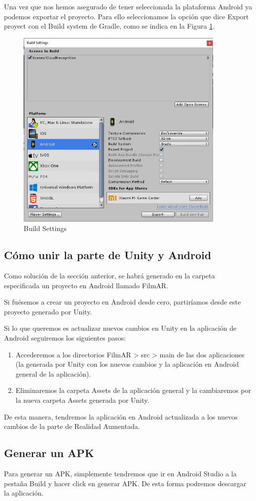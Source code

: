 \begin{enumerate}
    Una vez que nos hemos asegurado de tener seleccionada la plataforma Android ya podemos exportar el proyecto. Para ello seleccionamos la opción 
    que dice Export proyect con el Build system de Gradle, como se indica en la Figura \ref{fig:BuildSettings}.
    \begin{figure}[H]
        \centering
        \includegraphics[width=4in]{figures/Appendix-A/CapturaBuildSettings.JPG}
        \caption{Build Settings}
        \label{fig:BuildSettings}
    \end{figure}
\end{enumerate}
\subsection{Cómo unir la parte de Unity y Android}
Como solución de la sección anterior, se habrá generado en la carpeta especificada un proyecto en Android llamado FilmAR.

Si fuésemos a crear un proyecto en Android desde cero, partiríamos desde este proyecto generado por Unity. 

Si lo que queremos es actualizar nuevos cambios en Unity en la aplicación de Android seguiremos los siguientes pasos:
\begin{enumerate}
    \item Accederemos a los directorios FilmAR > src > main de las dos aplicaciones (la generada por Unity con los nuevos cambios 
    y la aplicación en Android general de la aplicación).
    \item Eliminaremos la carpeta Assets de la aplicación general y la cambiaremos por la nueva carpeta Assets generada por Unity.
\end{enumerate}
De esta manera, tendremos la aplicación en Android actualizada a los nuevos cambios de la parte de Realidad Aumentada.
\subsection{Generar un APK}
Para generar un APK, simplemente tendremos que ir en Android Studio a la pestaña Build y hacer click en generar APK. De esta forma podremos 
descargar la aplicación.